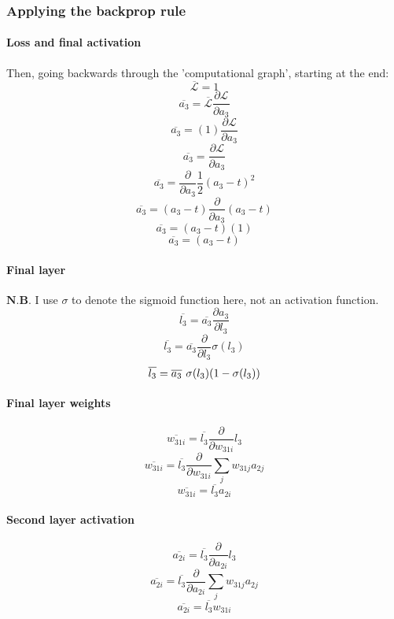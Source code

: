 \documentclass{article}
\begin{document}
\subsubsection{Applying the backprop rule}
\paragraph{Loss and final activation}
Then, going backwards through the 'computational graph', starting at the end:
\begin{equation}\overline{\mathcal{L}} = 1\end{equation}
\[\overline{a_3} = \overline{\mathcal{L}} \frac{\partial{\mathcal{L}}}{\partial{a_3}}\]
\[\overline{a_3} = (1) \frac{\partial{\mathcal{L}}}{\partial{a_3}}\]
\[\overline{a_3} = \frac{\partial{\mathcal{L}}}{\partial{a_3}}\]
\[\overline{a_3} = \frac{\partial}{\partial{a_3}} \frac{1}{2}(a_3 - t)^{2}\]
\[\overline{a_3} = (a_3 - t) \frac{\partial}{\partial{a_3}} (a_3 - t)\]
\[\overline{a_3} = (a_3 - t) (1)\]
\begin{equation}
\overline{a_3} = (a_3 - t)
\end{equation}
\paragraph{Final layer}
$\bm{N.B.}$ I use $\sigma$ to denote the sigmoid function here, not an activation function.
\[\overline{l_3} = \overline{a_3} \frac{\partial{a_3}}{\partial{l_3}}\]
\[\overline{l_3} = \overline{a_3} \frac{\partial}{\partial{l_3}} \sigma(l_3)\]
\begin{equation}
    \overline{l_3} = \overline{a_3} \hspace{0.125cm} \sigma(l_3) (1 - \sigma(l_3))
\end{equation}
\paragraph{Final layer weights}
\[\overline{w_{31i}} = \overline{l_3} \frac{\partial}{\partial{w_{31i}}} l_3\]
\[\overline{w_{31i}} = \overline{l_3} \frac{\partial}{\partial{w_{31i}}} \sum_{j} w_{31j} a_{2j}\]
\begin{equation}
    \overline{w_{31i}} = \overline{l_3} a_{2i}
\end{equation}
\paragraph{Second layer activation}
\[\overline{a_{2i}} = \overline{l_3} \frac{\partial}{\partial{a_{2i}}} l_3\]
\[\overline{a_{2i}} = \overline{l_3} \frac{\partial}{\partial{a_{2i}}} \sum_{j} w_{31j}a_{2j}\]
\begin{equation}
    \overline{a_{2i}} = \overline{l_3} w_{31i}
\end{equation}
\end{document}
